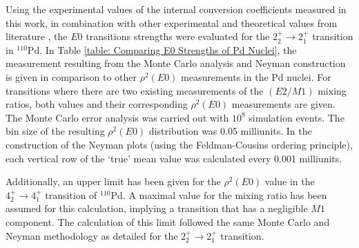 Using the experimental values of the internal conversion coefficients measured in this work, in combination with other experimental and theoretical values from literature \cite{KIBEDI2008202,ENSDF110Pd}, the $E0$ transitions strengths were evaluated for the $2_2^+ \rightarrow 2_1^+$ transition in $^{110}\mathrm{Pd}$. In Table \ref{table: Comparing E0 Strengths of Pd Nuclei}, the measurement resulting from the Monte Carlo analysis and Neyman construction is given in comparison to other $\rho^2(E0)$ measurements in the Pd nuclei. For transitions where there are two existing measurements of the $(E2/M1)$ mixing ratios, both values and their corresponding $\rho^2(E0)$ measurements are given. The Monte Carlo error analysis was carried out with $10^8$ simulation events. The bin size of the resulting $\rho^2(E0)$ distribution was 0.05 milliunits. In the construction of the Neyman plots (using the Feldman-Cousins ordering principle), each vertical row of the `true' mean value was calculated every 0.001 milliunits.

Additionally, an upper limit has been given for the $\rho^2(E0)$ value in the $4^+_2 \rightarrow 4^+_1$ transition of $^{110}$Pd. A maximal value for the mixing ratio has been assumed for this calculation, implying a transition that has a negligible $M1$ component. The calculation of this limit followed the same Monte Carlo and Neyman methodology as detailed for the $2^+_2 \rightarrow 2^+_1$ transition. 

